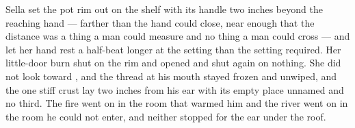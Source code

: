 Sella set the pot rim out on the shelf with its handle two inches beyond the reaching hand --- farther than the hand could close, near enough that the distance was a thing a man could measure and no thing a man could cross --- and let her hand rest a half-beat longer at the setting than the setting required. Her little-door burn shut on the rim and opened and shut again on nothing. She did not look toward , and the thread at his mouth stayed frozen and unwiped, and the one stiff crust lay two inches from his ear with its empty place unnamed and no third. The fire went on in the room that warmed him and the river went on in the room he could not enter, and neither stopped for the ear under the roof.

